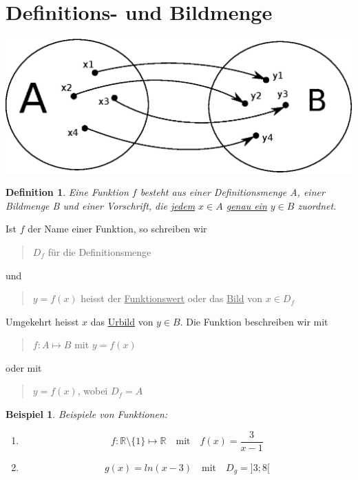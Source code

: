\documentclass{report}
\newtheorem{mydef}{Definition}
\newtheorem{myexample}{Beispiel}
\begin{document}
\section{Definitions- und Bildmenge}
\begin{center}\includegraphics[scale=0.5]{img/4-definition-function.eps}\end{center}
\begin{mydef}Eine Funktion $f$ besteht aus einer Definitionsmenge A, einer Bildmenge B und einer Vorschrift, die \underline{jedem} $x \in A$ \underline{genau ein} $y \in B$ zuordnet.\end{mydef}
Ist $f$ der Name einer Funktion, so schreiben wir
\begin{quote}$D_f$ für die Definitionsmenge\end{quote}
und
\begin{quote}$y = f(x)$ heisst der \underline{Funktionswert} oder das \underline{Bild} von $x \in D_f$\end{quote}
Umgekehrt heisst $x$ das \underline{Urbild} von $y \in B$. Die Funktion beschreiben wir mit
\begin{quote}$f: A \mapsto B$ mit $y = f(x)$\end{quote}
oder mit
\begin{quote}$y = f(x)$, wobei $D_f = A$\end{quote}
\begin{myexample}Beispiele von Funktionen:\begin{enumerate}
\item\begin{equation}f: \mathbb{R} \setminus \{1\} \mapsto \mathbb{R} \quad \mbox{mit} \quad f(x) = \frac{3}{x-1}\end{equation}
\item \begin{equation}g(x) = ln(x-3) \quad \mbox{mit} \quad D_g = ]3 ; 8[\end{equation}\end{enumerate}\end{myexample}
\end{document}

